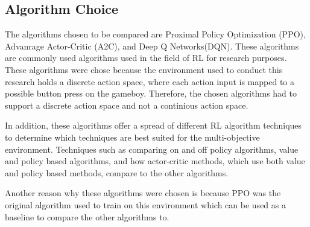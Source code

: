 \subsection{Algorithm Choice}


The algorithms chosen to be compared are Proximal Policy Optimization (PPO), Advanrage Actor-Critic (A2C), and Deep Q Networks(DQN). These algorithms are commonly used algorithms used in the field of RL for research purposes. These algorithms were chose because the environment used to conduct this research holds a discrete action space, where each action input is mapped to a possible button press on the gameboy. Therefore, the chosen algorithms had to support a discrete action space and not a continious action space.

In addition, these algorithms offer a spread of different RL algorithm techniques to determine which techniques are best suited for the multi-objective environment. Techniques such as comparing on and off policy algorithms, value and policy based algorithms, and how actor-critic methods, which use both value and policy based methods, compare to the other algorithms.

Another reason why these algorithms were chosen is because PPO was the original algorithm used to train on this environment which can be used as a baseline to compare the other algorithms to. 